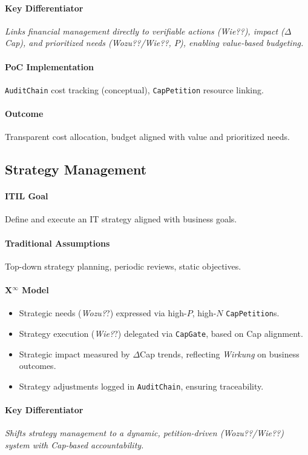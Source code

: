 \documentclass[12pt, a4paper]{scrartcl}
\newcommand{\Xinf}{X$^\infty$}                        %
\newcommand{\DeltaCap}{$\Delta$Cap}                    %
\newcommand{\Wirkung}{\textit{Wirkung}}                 %
\newcommand{\CapGate}{\texttt{CapGate}}
\newcommand{\AuditChain}{\texttt{AuditChain}}
\newcommand{\CapPetition}{\texttt{CapPetition}}        %
\newcommand{\Wozu}{\textit{Wozu?}}                      %
\newcommand{\Wie}{\textit{Wie?}}                        %
\begin{document}
\paragraph{Key Differentiator} \textit{Links financial management directly to verifiable actions (\Wie?), impact (\DeltaCap{}), and prioritized needs (\Wozu?/\Wie?, $P$), enabling value-based budgeting.}
\paragraph{PoC Implementation} \AuditChain{} cost tracking (conceptual), \CapPetition{} resource linking.
\paragraph{Outcome} Transparent cost allocation, budget aligned with value and prioritized needs.

\subsection{Strategy Management} %
\paragraph{ITIL Goal} Define and execute an IT strategy aligned with business goals.
\paragraph{Traditional Assumptions} Top-down strategy planning, periodic reviews, static objectives.
\paragraph*{\Xinf{} Model}
\begin{itemize}
    \item Strategic needs (\Wozu?) expressed via high-$P$, high-$N$ \CapPetition{}s.
    \item Strategy execution (\Wie?) delegated via \CapGate{}, based on Cap alignment.
    \item Strategic impact measured by \DeltaCap{} trends, reflecting \Wirkung{} on business outcomes.
    \item Strategy adjustments logged in \AuditChain{}, ensuring traceability.
\end{itemize}
\paragraph{Key Differentiator} \textit{Shifts strategy management to a dynamic, petition-driven (\Wozu?/\Wie?) system with Cap-based accountability.}
\end{document}
